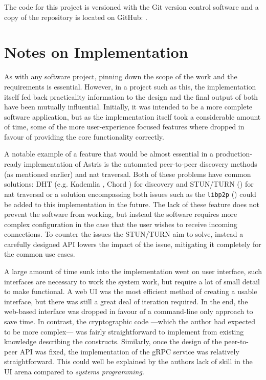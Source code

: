 The code for this project is versioned with the Git version control software and a copy of the repository is located on GitHub: \surl{\astrisrepo}.

\section{Notes on Implementation}
\label{ch:sw:notes}

As with any software project, pinning down the scope of the work and the requirements is essential. However, in a project such as this, the implementation itself fed back practicality information to the design and the final output of both have been mutually influential. Initially, it was intended to be a more complete software application, but as the implementation itself took a considerable amount of time, some of the more user-experience focused features where dropped in favour of providing the core functionality correctly.

A notable example of a feature that would be almost essential in a production-ready implementation of Astris is the automated peer-to-peer discovery methods (as mentioned earlier) and \gls{nat} traversal. Both of these problems have common solutions: DHT (e.g. Kademlia \cite{maymounkovKademliaPeertopeerInformation2002}, Chord \cite{ionstoicaChordScalablePeertopeer}) for discovery and STUN/TURN () for \gls{nat} traversal or a solution encompassing both issues such as the \texttt{libp2p} () could be added to this implementation in the future. The lack of these feature does not prevent the software from working, but instead the software requires more complex configuration in the case that the user wishes to receive incoming connections. To counter the issues the STUN/TURN aim to solve, instead a carefully designed API lowers the impact of the issue, mitigating it completely for the common use cases.

A large amount of time sunk into the implementation went on user interface, such interfaces are necessary to work the system work, but require a lot of small detail to make functional. A web UI was the most efficient method of creating a usable interface, but there was still a great deal of iteration required. In the end, the web-based interface was dropped in favour of a command-line only approach to save time. In contrast, the cryptographic code ---which the author had expected to be more complex--- was fairly straightforward to implement from existing knowledge describing the constructs. Similarly, once the design of the peer-to-peer API was fixed, the implementation of the gRPC service was relatively straightforward. This could well be explained by the authors lack of skill in the UI arena compared to \emph{systems programming}.


